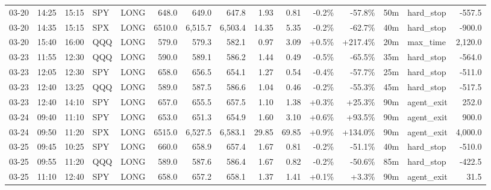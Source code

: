 \documentclass[11pt,a4paper,twoside]{article}
\begin{document}
\begin{landscape}
\begin{center}
\begin{longtable}{>{\color{txtmain}}l l l l l r r r r r r r r >{\color{txtmain}}l r}
03-20 & 14:25 & 15:15 & SPY & LONG & 648.0 & 649.0 & 647.8 & 1.93 & 0.81 & \textcolor{lossred}{-0.2\%} & \textcolor{lossred}{-57.8\%} & 50m & hard\_stop & \textcolor{lossred}{-557.5} \\
03-20 & 14:35 & 15:15 & SPX & LONG & 6510.0 & 6,515.7 & 6,503.4 & 14.35 & 5.35 & \textcolor{lossred}{-0.2\%} & \textcolor{lossred}{-62.7\%} & 40m & hard\_stop & \textcolor{lossred}{-900.0} \\
03-20 & 15:40 & 16:00 & QQQ & LONG & 579.0 & 579.3 & 582.1 & 0.97 & 3.09 & \textcolor{wingreen}{+0.5\%} & \textcolor{wingreen}{+217.4\%} & 20m & max\_time & \textcolor{wingreen}{2,120.0} \\
03-23 & 11:55 & 12:30 & QQQ & LONG & 590.0 & 589.1 & 586.2 & 1.44 & 0.49 & \textcolor{lossred}{-0.5\%} & \textcolor{lossred}{-65.5\%} & 35m & hard\_stop & \textcolor{lossred}{-564.0} \\
03-23 & 12:05 & 12:30 & SPY & LONG & 658.0 & 656.5 & 654.1 & 1.27 & 0.54 & \textcolor{lossred}{-0.4\%} & \textcolor{lossred}{-57.7\%} & 25m & hard\_stop & \textcolor{lossred}{-511.0} \\
03-23 & 12:40 & 13:25 & QQQ & LONG & 589.0 & 587.5 & 586.6 & 1.04 & 0.46 & \textcolor{lossred}{-0.2\%} & \textcolor{lossred}{-55.3\%} & 45m & hard\_stop & \textcolor{lossred}{-517.5} \\
03-23 & 12:40 & 14:10 & SPY & LONG & 657.0 & 655.5 & 657.5 & 1.10 & 1.38 & \textcolor{wingreen}{+0.3\%} & \textcolor{wingreen}{+25.3\%} & 90m & agent\_exit & \textcolor{wingreen}{252.0} \\
03-24 & 09:40 & 11:10 & SPY & LONG & 653.0 & 651.3 & 654.9 & 1.60 & 3.10 & \textcolor{wingreen}{+0.6\%} & \textcolor{wingreen}{+93.5\%} & 90m & agent\_exit & \textcolor{wingreen}{900.0} \\
03-24 & 09:50 & 11:20 & SPX & LONG & 6515.0 & 6,527.5 & 6,583.1 & 29.85 & 69.85 & \textcolor{wingreen}{+0.9\%} & \textcolor{wingreen}{+134.0\%} & 90m & agent\_exit & \textcolor{wingreen}{4,000.0} \\
03-25 & 09:45 & 10:25 & SPY & LONG & 660.0 & 658.9 & 657.4 & 1.67 & 0.81 & \textcolor{lossred}{-0.2\%} & \textcolor{lossred}{-51.1\%} & 40m & hard\_stop & \textcolor{lossred}{-510.0} \\
03-25 & 09:55 & 11:20 & QQQ & LONG & 589.0 & 587.6 & 586.4 & 1.67 & 0.82 & \textcolor{lossred}{-0.2\%} & \textcolor{lossred}{-50.6\%} & 85m & hard\_stop & \textcolor{lossred}{-422.5} \\
03-25 & 11:10 & 12:40 & SPY & LONG & 658.0 & 657.2 & 658.1 & 1.37 & 1.41 & \textcolor{wingreen}{+0.1\%} & \textcolor{wingreen}{+3.3\%} & 90m & agent\_exit & \textcolor{wingreen}{31.5} \\

\end{longtable}
\end{center}
\end{landscape}
\end{document}
